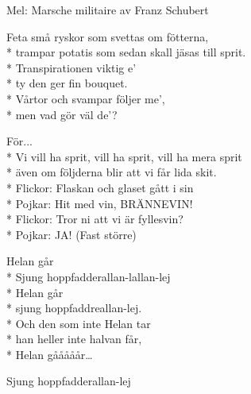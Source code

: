 \begin{SongText}
    \begin{SongInfo}
        Mel: Marsche militaire av Franz Schubert
    \end{SongInfo}
    \begin{SongVerse}
        Feta små ryskor som svettas om fötterna,\\*%
        trampar potatis som sedan skall jäsas till sprit.\\*%
        Transpirationen viktig e’\\*%
        ty den ger fin bouquet.\\*%
        Vårtor och svampar följer me’,\\*%
        men vad gör väl de’?
    \end{SongVerse}
    \begin{SongVerse}
        För...\\*%
        Vi vill ha sprit, vill ha sprit, vill ha mera sprit\\*%
        även om följderna blir att vi får lida skit.\\*%
        Flickor: Flaskan och glaset gått i sin\\*%
        Pojkar: Hit med vin, BRÄNNEVIN!\\*%
        Flickor: Tror ni att vi är fyllesvin?\\*%
        Pojkar: JA! (Fast större)
    \end{SongVerse}
\end{SongText}
\begin{SongText}
    \begin{SongVerse}
        Helan går\\*%
        Sjung hoppfadderallan-lallan-lej\\*%
        Helan går\\*%
        sjung hoppfaddreallan-lej.\\*%
        Och den som inte Helan tar\\*%
        han heller inte halvan får,\\*%
        Helan gååååår…
    \end{SongVerse}
    \begin{SongVerse}
        Sjung hoppfadderallan-lej
    \end{SongVerse}
\end{SongText}
